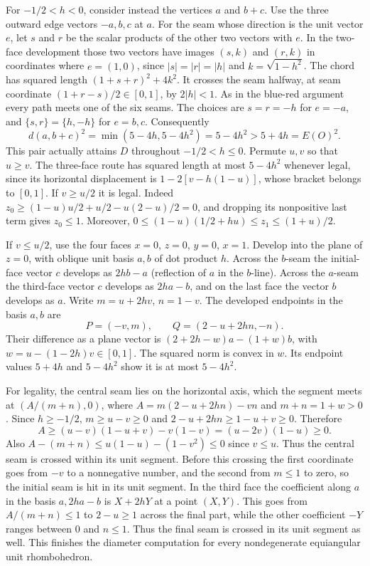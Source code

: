 \documentclass[10pt,letterpaper]{article}
\begin{document}
For $-1/2<h<0$, consider instead the vertices $a$ and $b+c$. Use the
three outward edge vectors $-a,b,c$ at $a$. For the seam whose direction
is the unit vector $e$, let $s$ and $r$ be the scalar products of the
other two vectors with $e$. In the two-face development those two vectors
have images $(s,k)$ and $(r,k)$ in coordinates where $e=(1,0)$, since
$|s|=|r|=|h|$ and $k=\sqrt{1-h^2}$. The chord has squared length
$(1+s+r)^2+4k^2$. It crosses the seam halfway, at seam coordinate
$(1+r-s)/2\in[0,1]$, by $2|h|<1$. As in the blue-red argument every
path meets one of the six seams. The choices are $s=r=-h$ for
$e=-a$, and $\{s,r\}=\{h,-h\}$ for $e=b,c$. Consequently
\[
 d(a,b+c)^2=\min(5-4h,5-4h^2)=5-4h^2>5+4h=E(O)^2.
\]
This pair actually attains $D$ throughout $-1/2<h\le0$. Permute $u,v$
so that $u\ge v$. The three-face route has squared length at most
$5-4h^2$ whenever legal, since its horizontal displacement is
$1-2[v-h(1-u)]$, whose bracket belongs to $[0,1]$. If $v\ge u/2$ it is
legal. Indeed $z_0\ge (1-u)u/2+u/2-u(2-u)/2=0$, and dropping its
nonpositive last term gives $z_0\le1$. Moreover,
$0\le(1-u)(1/2+hu)\le z_1\le(1+u)/2$.

If $v\le u/2$, use the four faces $x=0$, $z=0$, $y=0$, $x=1$.
Develop into the plane of $z=0$, with oblique unit basis $a,b$ of dot
product $h$. Across the $b$-seam the initial-face vector $c$ develops
as $2hb-a$ (reflection of $a$ in the $b$-line). Across the $a$-seam
the third-face vector $c$ develops as $2ha-b$, and on the last face the
vector $b$ develops as $a$. Write $m=u+2hv$, $n=1-v$. The developed
endpoints in the basis $a,b$ are
\[
 P=(-v,m),\qquad Q=(2-u+2hn,-n).
\]
Their difference as a plane vector is
$(2+2h-w)a-(1+w)b$, with $w=u-(1-2h)v\in[0,1]$.
The squared norm is convex in $w$. Its endpoint values $5+4h$ and
$5-4h^2$ show it is at most $5-4h^2$.

For legality, the central seam lies on the horizontal axis, which the
segment meets at $(A/(m+n),0)$, where
$A=m(2-u+2hn)-vn$ and $m+n=1+w>0$. Since $h\ge-1/2$,
$m\ge u-v\ge0$ and $2-u+2hn\ge1-u+v\ge0$. Therefore
\[
 A\ge(u-v)(1-u+v)-v(1-v)=(u-2v)(1-u)\ge0 .
\]
Also $A-(m+n)\le u(1-u)-(1-v^2)\le0$ since $v\le u$.
Thus the central seam is crossed within its unit segment. Before this
crossing the first coordinate goes from $-v$ to a nonnegative number,
and the second from $m\le1$ to zero, so the initial seam is hit in its
unit segment. In the third face the coefficient along $a$ in the basis
$a,2ha-b$ is $X+2hY$ at a point $(X,Y)$. This goes from $A/(m+n)\le1$
to $2-u\ge1$ across the final part, while the other coefficient $-Y$
ranges between $0$ and $n\le1$. Thus the final seam is crossed in its
unit segment as well. This finishes the diameter computation for every
nondegenerate equiangular unit rhombohedron.
\end{document}
